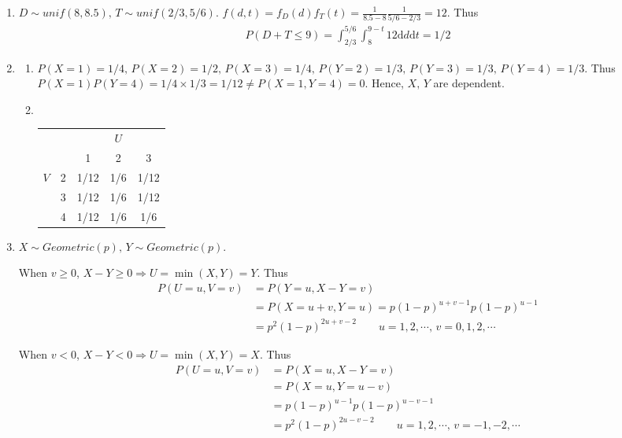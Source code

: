 \documentclass{article}
\begin{document}
\begin{enumerate}[leftmargin = 0 em, label = \arabic*., font = \bfseries]
\begin{enumerate}
	\end{enumerate}

	\item 
	$D \sim unif(8,8.5),\, T \sim unif(2/3, 5/6)$. $f(d,t) = f_D (d) f_T (t) = \frac{1}{8.5 - 8} \frac{1}{5/6 - 2/3} = 12$. Thus
	\begin{align*}
	P(D+T \leq 9) = \int_{2/3}^{5/6} \int_{8}^{9-t} 12 \mathrm{d}d \mathrm{d}t = 1/2
	\end{align*}

	\item
	\begin{enumerate}
	 	\item 
	$P(X = 1) = 1/4, \, P(X = 2) = 1/2,\, P(X = 3) = 1/4,\, P(Y = 2) = 1/3,\, P(Y = 3) = 1/3,\, P(Y = 4) = 1/3$. Thus $P(X = 1) P(Y = 4) = 1/4 \times 1/3 = 1/12 \neq P(X = 1, Y = 4) = 0$. Hence, $X,\, Y$ are dependent.

	\item \ 

\begin{center}
	\begin{tabular}{cc|ccc}
                     &   & \multicolumn{3}{c}{$U$} \\
                     &   & 1      & 2     & 3      \\
                     \hline
\multirow{3}{*}{$V$} & 2 & 1/12   & 1/6   & 1/12   \\
                     & 3 & 1/12   & 1/6   & 1/12   \\
                     & 4 & 1/12   & 1/6   & 1/6   
\end{tabular}
	\end{center}
	 \end{enumerate}

	 \item 
	 $X \sim Geometric(p),\, Y \sim Geometric(p)$. 

	 When $v \geq 0$, $X - Y \geq 0 \Rightarrow U = \min (X, Y) = Y$. Thus
	 \begin{align*}
	 P(U = u, V = v) &= P(Y = u, X - Y = v) \\
	 & = P(X = u+v, Y = u) = p (1 - p)^{u + v - 1} p (1 - p)^{u-1} \\
	 & = p^2 (1- p)^{2u + v - 2} \qquad u = 1, 2, \cdots,\, v = 0, 1, 2, \cdots
	 \end{align*}

	 When $v < 0$, $X - Y <0 \Rightarrow U = \min(X,Y) = X$. Thus 
	 \begin{align*}
	 P(U = u, V = v) &= P(X = u, X- Y = v)\\
	 & = P(X = u, Y = u - v)\\
	 & = p(1- p)^{u-1} p (1- p)^{u - v - 1}\\
	 & = p^2 (1- p)^{2u - v - 2} \qquad u = 1, 2, \cdots, \, v = -1, -2, \cdots
	 \end{align*}


\end{enumerate}
\end{document}

